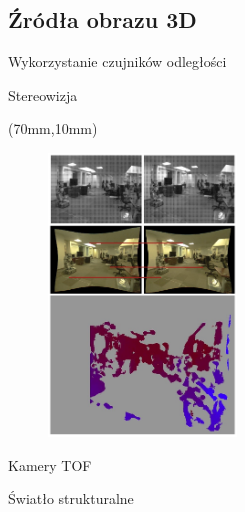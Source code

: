 \documentclass[xcolor=x11names,compress]{beamer}
\renewcommand{\(}{\begin{columns}}
\renewcommand{\)}{\end{columns}}
\newcommand{\<}[1]{\begin{column}{#1}}
\renewcommand{\>}{\end{column}}
\begin{document}
\subsection{Źródła obrazu 3D}
\begin{frame}{Wykorzystanie czujników odległości}

\end{frame}

\begin{frame}{Stereowizja}


\begin{textblock*}{50mm}(70mm,10mm)%
    \begin{minipage}[l]{50mm}%

	\begin{figure}[h!]
    \centering
    \includegraphics[width=5.0cm]{../Common/img/stereo_steps_vert}
    \end{figure}

    \end{minipage}
\end{textblock*}

\end{frame}

\begin{frame}{Kamery TOF}

\end{frame}

\begin{frame}{Światło strukturalne}

\end{frame}
\end{document}
